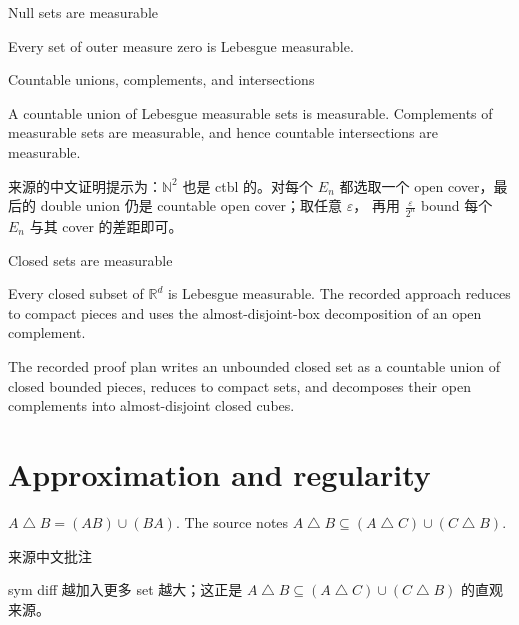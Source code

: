 \begin{theorem}{Null sets are measurable}

Every set of outer measure zero is Lebesgue measurable.

\end{theorem}

\begin{theorem}{Countable unions, complements, and intersections}

A countable union of Lebesgue measurable sets is measurable. Complements of measurable sets are measurable, and hence countable intersections are measurable.

\end{theorem}

来源的中文证明提示为：\(\mathbb{N}^{2}\) 也是 ctbl 的。对每个 \(E_{n}\) 都选取一个 open cover，最后的 double union 仍是 countable open cover；取任意 \(\varepsilon\)， 再用 \(\frac{\varepsilon}{2^{n}}\) bound 每个 \(E_{n}\) 与其 cover 的差距即可。

\begin{theorem}{Closed sets are measurable}

Every closed subset of \(\mathbb{R}^{d}\) is Lebesgue measurable. The recorded approach reduces to compact pieces and uses the almost-disjoint-box decomposition of an open complement.

\end{theorem}

The recorded proof plan writes an unbounded closed set as a countable union of closed bounded pieces, reduces to compact sets, and decomposes their open complements into almost-disjoint closed cubes.

\section{Approximation and regularity}

\begin{definition}{}

\(A \bigtriangleup B = \left( {AB} \right) \cup \left( {BA} \right)\). The source notes \(A \bigtriangleup B \subseteq \left( {A \bigtriangleup C} \right) \cup \left( {C \bigtriangleup B} \right)\).

\end{definition}

\begin{qlremark}{来源中文批注}

sym diff 越加入更多 set 越大；这正是 \(A \bigtriangleup B \subseteq \left( {A \bigtriangleup C} \right) \cup \left( {C \bigtriangleup B} \right)\) 的直观来源。

\end{qlremark}


